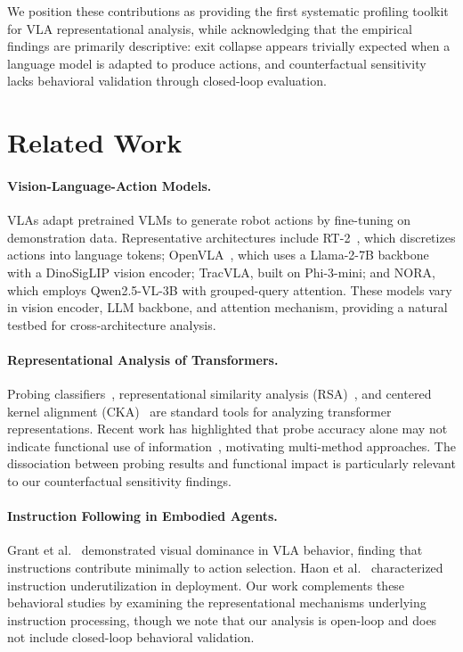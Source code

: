 \documentclass[letterpaper]{article}
\begin{document}
We position these contributions as providing the first systematic profiling toolkit for VLA representational analysis, while acknowledging that the empirical findings are primarily descriptive: exit collapse appears trivially expected when a language model is adapted to produce actions, and counterfactual sensitivity lacks behavioral validation through closed-loop evaluation.

\section{Related Work}

\paragraph{Vision-Language-Action Models.}
VLAs adapt pretrained VLMs to generate robot actions by fine-tuning on demonstration data. Representative architectures include RT-2~\citep{brohan2023rt2}, which discretizes actions into language tokens; OpenVLA~\citep{kim2024openvla}, which uses a Llama-2-7B backbone with a DinoSigLIP vision encoder; TracVLA, built on Phi-3-mini; and NORA, which employs Qwen2.5-VL-3B with grouped-query attention. These models vary in vision encoder, LLM backbone, and attention mechanism, providing a natural testbed for cross-architecture analysis.

\paragraph{Representational Analysis of Transformers.}
Probing classifiers~\citep{belinkov2017neural,hewitt2019structural}, representational similarity analysis (RSA)~\citep{kriegeskorte2008representational}, and centered kernel alignment (CKA)~\citep{kornblith2019similarity} are standard tools for analyzing transformer representations. Recent work has highlighted that probe accuracy alone may not indicate functional use of information~\citep{hewitt2019designing}, motivating multi-method approaches. The dissociation between probing results and functional impact is particularly relevant to our counterfactual sensitivity findings.

\paragraph{Instruction Following in Embodied Agents.}
Grant et al.~\citeyearpar{grant2026visual} demonstrated visual dominance in VLA behavior, finding that instructions contribute minimally to action selection. Haon et al.~\citeyearpar{haon2025instructions} characterized instruction underutilization in deployment. Our work complements these behavioral studies by examining the representational mechanisms underlying instruction processing, though we note that our analysis is open-loop and does not include closed-loop behavioral validation.
\end{document}
